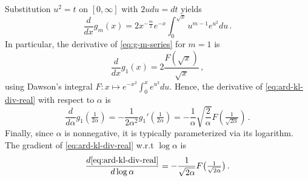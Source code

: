 \documentclass[a4paper,10pt]{article}
\begin{document}
Substitution $u^2 = t$ on $[0, \infty]$ with $2u du = dt$ yields
\begin{equation}  \label{eq:g-m-deriv-int-3}
  \frac{d}{d x} g_m(x)
    = 2 x^{-\tfrac{m}2} e^{-x}
        \int_0^{\sqrt{x}} u^{m - 1} e^{u^2} du
    \,.
\end{equation}
In particular, the derivative of \eqref{eq:g-m-series} for $m=1$ is
\begin{equation}  \label{eq:g-m-deriv-one}
  \frac{d}{d x} g_1(x)
    = 2 \frac{F(\sqrt{x})}{\sqrt{x}}
    \,,
\end{equation}
using Dawson's integral $
  F
  \colon x \mapsto e^{-x^2} \int_0^x e^{u^2} du
$.
%
Hence, the derivative of \eqref{eq:ard-kl-div-real} with respect to $\alpha$ is
$$
\frac{d}{d \alpha} g_1(\tfrac1{2\alpha})
  = -\frac1{2 \alpha^2} g_1'(\tfrac1{2\alpha})
  = -\frac1{\alpha} \sqrt{\frac2{\alpha}} F(\tfrac1{\sqrt{2\alpha}})
  \,. $$
Finally, since $\alpha$ is nonnegative, it is typically parameterized via its logarithm.
The gradient of \eqref{eq:ard-kl-div-real} w.r.t $\log \alpha$ is
\begin{equation}  \label{eq:real-kl-div-deriv-log}
  \frac{d \eqref{eq:ard-kl-div-real}}{d\log \alpha}
    = - \frac1{\sqrt{2\alpha}} F\bigl(\tfrac1{\sqrt{2\alpha}}\bigr)
    \,.
\end{equation}
\end{document}
